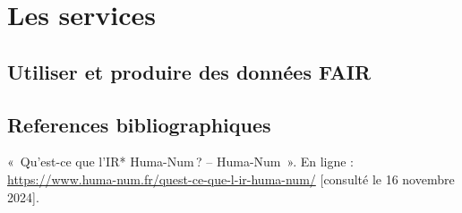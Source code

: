 \documentclass[
  letterpaper,
  DIV=11,
  numbers=noendperiod]{scrreport}
\newlength{\cslhangindent}
\newenvironment{CSLReferences}[2] %
 {\begin{list}{}{%
  \setlength{\itemindent}{0pt}
  \setlength{\leftmargin}{0pt}
  \setlength{\parsep}{0pt}
  \ifodd #1
   \setlength{\leftmargin}{\cslhangindent}
   \setlength{\itemindent}{-1\cslhangindent}
  \fi
  \setlength{\itemsep}{#2\baselineskip}}}
 {\end{list}}
\begin{document}
\part{Les services}

\label{service}

\chapter{Utiliser et produire des données
FAIR}\label{utiliser-et-produire-des-donnuxe9es-fair}

\cleardoublepage
{}
{}
\appendix

\chapter*{References
bibliographiques}\label{references-bibliographiques}


\label{refs}
\begin{CSLReferences}{0}{1}
{«~Qu'est-ce que l'IR* Huma-Num\,? -- Huma-Num~»}. En ligne :
\url{https://www.huma-num.fr/quest-ce-que-l-ir-huma-num/} {[}consulté le
16 novembre 2024{]}.

\end{CSLReferences}
\end{document}
